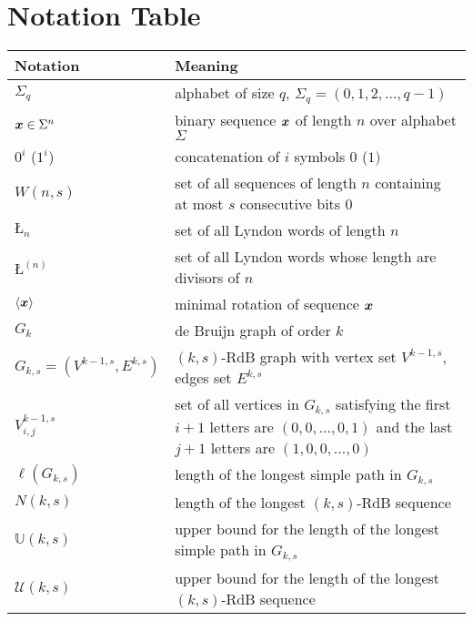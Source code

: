 \chapter*{Notation Table} 
\begin{center}
    \begin{tabular}{| m{2.5cm} | m{9cm} |}
     	\hline
     	\textbf{Notation} &\textbf{ Meaning}\\
     	\hline
     	$\Sigma_{q}$ & alphabet of size $q$, $\Sigma_{q}=(0,1,2,\ldots,q-1)$  \\  \hline
     	${\boldsymbol x}\in\Sigma^{n}$ & binary sequence ${\boldsymbol x}$ of length $n$ over alphabet $\Sigma$ \\ \hline
     	$0^{i}$ ($1^{i}$) & concatenation of $i$ symbols $0$ ($1)$ \\ \hline
     	$W(n,s)$ & set of all sequences of length $n$ containing at most $s$ consecutive bits $0$\\  \hline
     	$\text{\L}_{n}$ & set of all Lyndon words of length $n$ \\ \hline
     	$\text{\L}^{(n)}$ & set of all Lyndon words whose length are divisors of $n$ \\ \hline
     	$\langle{\boldsymbol x}\rangle$ & minimal rotation of sequence ${\boldsymbol x}$ \\ \hline
     	$G_{k}$ & de Bruijn graph of order $k$ \\  \hline
     	$G_{k,s} = (V^{k-1,s},E^{k,s})$ & $(k,s)$-RdB graph with vertex set $V^{k-1,s}$, edges set $E^{k,s}$  \\  \hline
     	$V^{k-1,s}_{i,j}$ & set of all vertices in $G_{k,s}$ satisfying the first $i+1$ letters are $(0,0,\ldots,0,1)$ and the last $j+1$ letters are $(1,0,0,\ldots,0)$ \\  \hline
     	$\ell(G_{k,s})$ & length of the longest simple path in $G_{k,s}$ \\ \hline
     	$N(k,s)$ & length of the longest $(k,s)$-RdB sequence \\ \hline
     	$\mathbb{U}(k,s)$ & upper bound for the length of the longest simple path in $G_{k,s}$ \\ \hline
     	$\mathcal{U}(k,s)$ & upper bound for the length of the longest $(k,s)$-RdB sequence \\ \hline
     	
     \end{tabular}   
\end{center}
 
